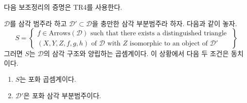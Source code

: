\noindent
다음 보조정리의 증명은 TR4를 사용한다.

\begin{lemma}
\label{lemma-construct-multiplicative-system}
$\mathcal{D}$를 삼각 범주라 하고
$\mathcal{D}' \subset \mathcal{D}$을 충만한 삼각 부분범주라 하자.
다음과 같이 놓자.
\begin{equation}
\label{equation-multiplicative-system}
S =
\left\{
\begin{matrix}
f \in \text{Arrows}(\mathcal{D})
\text{ such that there exists a distinguished triangle }\\
(X, Y, Z, f, g, h) \text{ of }\mathcal{D}\text{ with }
Z\text{ isomorphic to an object of }\mathcal{D}'
\end{matrix}
\right\}
\end{equation}
그러면 $S$는 $\mathcal{D}$의 삼각 구조와 양립하는 곱셈계이다.
이 상황에서 다음 두 조건은 동치이다.
\begin{enumerate}
\item $S$는 포화 곱셈계이다.
\item $\mathcal{D}'$은 포화 삼각 부분범주이다.
\end{enumerate}
\end{lemma}

